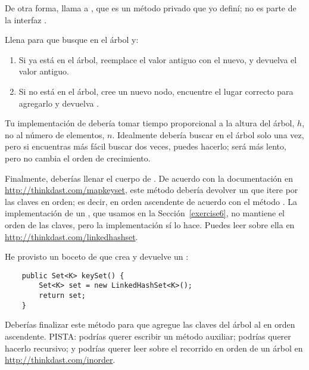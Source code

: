 \documentclass[12pt]{book}
\theoremstyle{exercise}
\begin{document}
De otra forma, llama a , que es un método privado que yo
definí; no es parte de la interfaz .

Llena  para que busque en el árbol y:

\begin{enumerate}

\item
  Si  ya está en el árbol, reemplace el valor antiguo con el
  nuevo, y devuelva el valor antiguo.

\item
  Si  no está en el árbol, cree un nuevo nodo, encuentre el
  lugar correcto para agregarlo y devuelva .

\end{enumerate}

Tu implementación de   debería tomar tiempo proporcional a la
altura del árbol, $h$, no al número de elementos, $n$. Idealmente
debería buscar en el árbol solo una vez, pero si encuentras más fácil
buscar dos veces, puedes hacerlo; será más lento, pero no cambia el
orden de crecimiento.


Finalmente, deberías llenar el cuerpo de .  De acuerdo con
la documentación en \url{http://thinkdast.com/mapkeyset}, este método
debería devolver un  que itere por las claves en orden; es decir,
en orden ascendente de acuerdo con el método .  La
implementación  de un , que usamos en la
Sección~\ref{exercise6}, no mantiene el orden de las claves, pero
la implementación  sí lo hace.  Puedes leer sobre ella
en \url{http://thinkdast.com/linkedhashset}.

He provisto un boceto de  que crea y devuelve un
:

\begin{verbatim}
    public Set<K> keySet() {
        Set<K> set = new LinkedHashSet<K>();
        return set;
    }
\end{verbatim}


Deberías finalizar este método para que agregue las claves del árbol al
 en orden ascendente. PISTA: podrías querer escribir un método
auxiliar; podrías querer hacerlo recursivo; y podrías querer leer sobre
el recorrido en orden de un árbol en
\url{http://thinkdast.com/inorder}.
\end{document}
